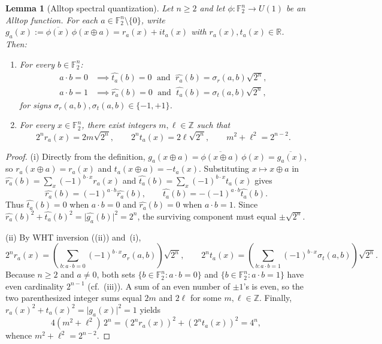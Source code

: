 \documentclass[11pt,a4paper]{article}
\theoremstyle{plain}
\newtheorem{lemma}{Lemma}[section]
\theoremstyle{definition}
\theoremstyle{remark}
\newcommand{\R}{\mathbb{R}}
\newcommand{\Z}{\mathbb{Z}}
\newcommand{\F}{\mathbb{F}}
\newcommand{\Uone}{U(1)}
\newcommand{\abs}[1]{\lvert#1\rvert}
\numberwithin{equation}{section}
\begin{document}
\begin{lemma}[Alltop spectral quantization]\label{lem:quantization}
Let $n \ge 2$ and let $\phi : \F_2^n \to \Uone$ be an Alltop function. For each $a \in \F_2^n \setminus \{0\}$, write $g_a(x) := \overline{\phi(x)}\,\phi(x \oplus a) = r_a(x) + i t_a(x)$ with $r_a(x), t_a(x) \in \R$. Then:
\begin{enumerate}[label=(\roman*),leftmargin=2em]
  \item For every $b \in \F_2^n$:
  \begin{align*}
    a \cdot b = 0 &\implies \widehat{t_a}(b) = 0 \;\text{ and }\; \widehat{r_a}(b) = \sigma_r(a, b)\sqrt{2^n}, \\
    a \cdot b = 1 &\implies \widehat{r_a}(b) = 0 \;\text{ and }\; \widehat{t_a}(b) = \sigma_t(a, b)\sqrt{2^n},
  \end{align*}
  for signs $\sigma_r(a, b), \sigma_t(a, b) \in \{-1, +1\}$.
  \item For every $x \in \F_2^n$, there exist integers $m, \ell \in \Z$ such that
  \[
    2^n r_a(x) = 2 m \sqrt{2^n}, \qquad 2^n t_a(x) = 2 \ell \sqrt{2^n}, \qquad m^2 + \ell^2 = 2^{n-2}.
  \]
\end{enumerate}
\end{lemma}

\begin{proof}
(i) Directly from the definition, $g_a(x \oplus a) = \overline{\phi(x \oplus a)}\,\phi(x) = \overline{g_a(x)}$, so $r_a(x \oplus a) = r_a(x)$ and $t_a(x \oplus a) = -t_a(x)$. Substituting $x \mapsto x \oplus a$ in $\widehat{r_a}(b) = \sum_x (-1)^{b \cdot x} r_a(x)$ and $\widehat{t_a}(b) = \sum_x (-1)^{b \cdot x} t_a(x)$ gives
\[
  \widehat{r_a}(b) = (-1)^{a \cdot b} \widehat{r_a}(b), \qquad \widehat{t_a}(b) = -(-1)^{a \cdot b} \widehat{t_a}(b).
\]
Thus $\widehat{t_a}(b) = 0$ when $a \cdot b = 0$ and $\widehat{r_a}(b) = 0$ when $a \cdot b = 1$. Since $\widehat{r_a}(b)^2 + \widehat{t_a}(b)^2 = \abs{\widehat{g_a}(b)}^2 = 2^n$, the surviving component must equal $\pm\sqrt{2^n}$.

(ii) By WHT inversion ((ii)) and~(i),
\[
  2^n r_a(x) = \left(\sum_{b : a \cdot b = 0} (-1)^{b \cdot x}\sigma_r(a, b)\right)\sqrt{2^n},
  \qquad
  2^n t_a(x) = \left(\sum_{b : a \cdot b = 1} (-1)^{b \cdot x}\sigma_t(a, b)\right)\sqrt{2^n}.
\]
Because $n \ge 2$ and $a \neq 0$, both sets $\{b \in \F_2^n : a \cdot b = 0\}$ and $\{b \in \F_2^n : a \cdot b = 1\}$ have even cardinality $2^{n-1}$ (cf.\ (iii)). A sum of an even number of $\pm 1$'s is even, so the two parenthesized integer sums equal $2m$ and $2\ell$ for some $m, \ell \in \Z$. Finally, $r_a(x)^2 + t_a(x)^2 = \abs{g_a(x)}^2 = 1$ yields
\[
  4(m^2 + \ell^2)\,2^n = (2^n r_a(x))^2 + (2^n t_a(x))^2 = 4^n,
\]
whence $m^2 + \ell^2 = 2^{n-2}$.
\end{proof}
\end{document}
